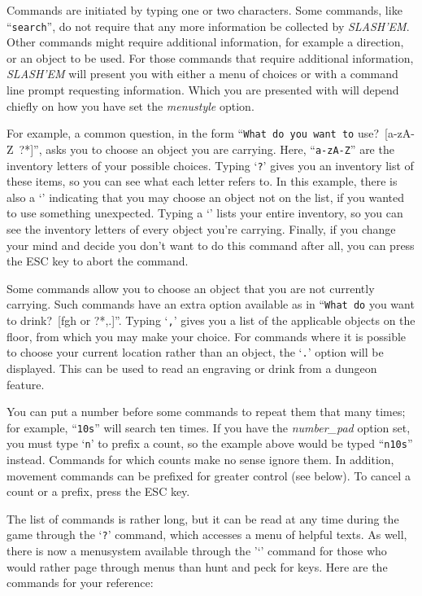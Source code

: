 
Commands are initiated by typing one or two characters.  Some commands,
like ``{\tt search}'', do not require that any more information be collected by
{\it SLASH'EM}.  Other commands might require additional information, for
example a direction, or an object to be used.  For those commands that
require additional information, {\it SLASH'EM\/} will present you with either a
menu of choices or with a command line prompt requesting information.  Which
you are presented with will depend chiefly on how you have set the
{\it menustyle\/} 
option.

For example, a common question, in the form ``{\tt What do you want to}
use?\ [a-zA-Z\ ?*]'', asks you to choose an object you are carrying.
Here, ``{\tt a-zA-Z}'' are the inventory letters of your possible choices.
Typing `{\tt ?}' gives you an inventory list of these items, so you can see
what each letter refers to.  In this example, there is also a `{\tt *}'
indicating that you may choose an object not on the list, if you
wanted to use something unexpected.  Typing a `{\tt *}' lists your entire
inventory, so you can see the inventory letters of every object you're
carrying.  Finally, if you change your mind and decide you don't want
to do this command after all, you can press the ESC key to abort the
command.

Some commands allow you to choose an object that you are not currently
carrying. Such commands have an extra option available as in ``{\tt What do}
you want to drink?\ [fgh or ?*,.]''. Typing `{\tt ,}' gives you a list of the
applicable objects on the floor, from which you may make your choice.
For commands where it is possible to choose your current location rather
than an object, the `{\tt .}' option will be displayed. This can be used to
read an engraving or drink from a dungeon feature.

You can put a number before some commands to repeat them that many
times; for example, ``{\tt 10s}'' will search ten times.  If you have the
{\it number_pad\/} 
option set, you must type `{\tt n}' to prefix a count, so the example above
would be typed ``{\tt n10s}'' instead.  Commands for which counts make no
sense ignore them.  In addition, movement commands can be prefixed for
greater control (see below).  To cancel a count or a prefix, press the
ESC key.

The list of commands is rather long, but it can be read at any time
during the game through the `{\tt ?}' command, which accesses a menu of
helpful texts.  As well,  there is now a menusystem available
through the '`{\tt }' command for those who would rather page through
menus than hunt and peck for keys. Here are the commands for your reference:
\blist{}

